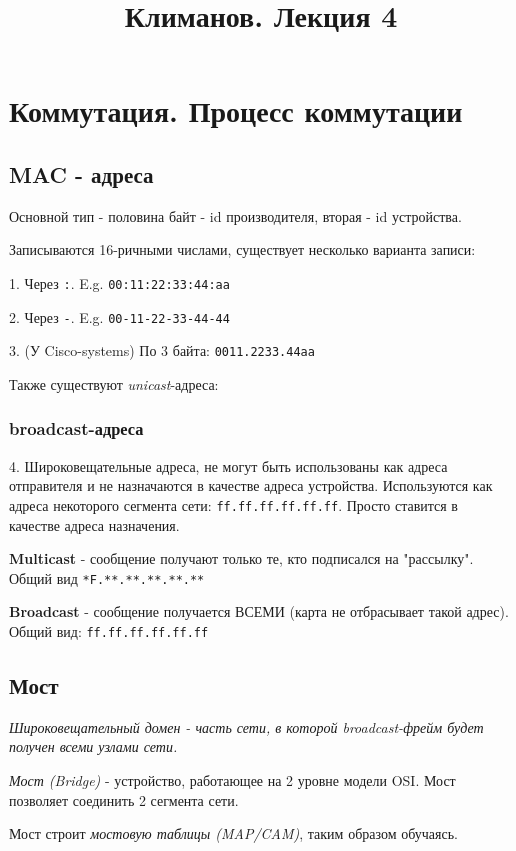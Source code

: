 \documentclass[a4paper,10pt]{article}
\title{Климанов. Лекция 4}
\begin{document}
	\maketitle
	
	\section{Коммутация. Процесс коммутации}
	
	\subsection{MAC - адреса}
	Основной тип - половина байт - id производителя, вторая - id устройства.
	
	Записываются 16-ричными числами, существует несколько варианта записи:
	
	1. Через \texttt{:}. E.g. \texttt{00:11:22:33:44:aa}
	
	2. Через \texttt{-}. E.g. \texttt{00-11-22-33-44-44}
	
	3. (У Cisco-systems) По 3 байта: \texttt{0011.2233.44aa}
	
	Также существуют \emph{unicast}-адреса:
	\subsubsection{broadcast-адреса}
	
		4. Широковещательные адреса, не могут быть использованы как адреса отправителя и  не назначаются в качестве адреса устройства. Используются как адреса некоторого сегмента сети: \texttt{ff.ff.ff.ff.ff.ff}. 
		Просто ставится в качестве адреса назначения. 
		
		\textbf{Multicast} - сообщение получают только те, кто подписался на "рассылку". Общий вид \texttt{*F.**.**.**.**.**}
		
		\textbf{Broadcast} - сообщение получается ВСЕМИ (карта не отбрасывает такой адрес). Общий вид: \texttt{ff.ff.ff.ff.ff.ff}
	
	\subsection{Мост}
	\textit{Широковещательный домен - часть сети, в которой broadcast-фрейм будет получен всеми узлами сети.}
	
	\emph{Мост (Bridge)} - устройство, работающее на 2 уровне модели OSI. Мост позволяет соединить 2 сегмента сети.
	
	Мост строит \emph{мостовую таблицы (MAP/CAM)}, таким образом обучаясь.
	
\end{document}
